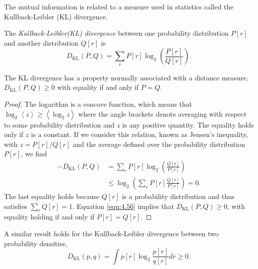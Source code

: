 \begin{rem}
  The mutual information is related to a measure used in statistics called the Kullback-Leibler (KL) divergence.
\end{rem}

\begin{defn}
  \label{defn:Kullback-Leibler (KL) divergence}
  The \emph{Kullback-Leibler(KL) divergence} between one probability distribution $P[r]$ and another distribution $Q[r]$ is
  \begin{equation}
    \label{equ:4.15}
    D_{\text{KL}}(P,Q)=\sum\limits_{r}P[r]\log_2\left( \frac{P[r]}{Q[r]} \right).
  \end{equation}
\end{defn}
\begin{thm}
  \label{thm:KLnon-negative}
  The KL divergence has a property normally associated with a distance measure, $D_{\text{KL}}(P, Q) \geq 0$ with equality if and only if $P=Q$.
  \begin{proof}
    The logarithm is a concave function, which means that $\log_2\left< z \right>\geq \left<\log_2z  \right>$
    where the angle brackets denote averaging with respect to some probability distribution and $z$ is any positive quantity. The equality holds only if $z$ is a constant. If we consider this relation, known as Jensen's inequality, with $z = P[r]/Q[r]$ and the average defined over the probability distribution $P[r]$, we find   
    \begin{equation}
      \begin{aligned}
        \label{equ:4.56}
        -D_{\text{KL}}(P,Q)&=\sum\limits_{r}{P[r]\log_2\left(
            \frac{Q[r]}{P[r]}  \right)}\\
        &\leq \log_2\left( \sum\limits_r{P[r] \frac{Q[r]}{P[r]}} \right)=0.
      \end{aligned}
    \end{equation}
    The last equality holds because $Q[r]$ is a probability distribution and thus
    satisfies $\sum_{r}Q[r]=1$. Equation \ref{equ:4.56} implies that $D_{\text{KL}}(P,Q)\geq 0$, with
    equality holding if and only if $P[r]=Q[r]$.
  \end{proof}   
\end{thm}

\begin{coro}
  A similar result holds for the
  Kullback-Leibler divergence between two probability densities,
  \begin{equation}
    \label{equ:4.57}
    D_{\text{KL}}(p,q)=\int {p[r]\log_2\frac{p[r]}{q[r]}}dr\geq 0.
  \end{equation}
\end{coro}

